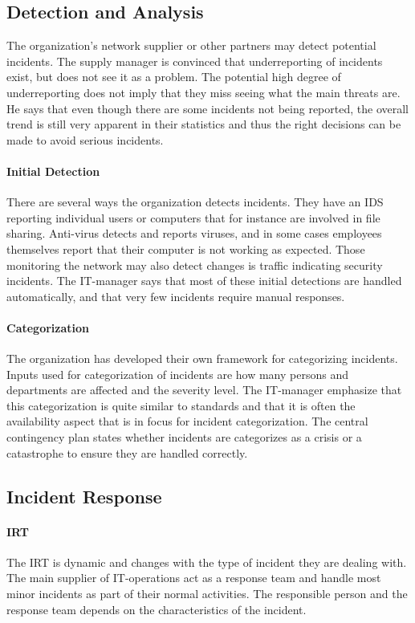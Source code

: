 \subsection{Detection and Analysis}
The organization's network supplier or other partners may detect potential incidents. The supply manager is convinced that underreporting of incidents exist, but does not see it as a problem. The potential high degree of underreporting does not imply that they miss seeing what the main threats are. He says that even though there are some incidents not being reported, the overall trend is still very apparent in their statistics and thus the right decisions can be made to avoid serious incidents. 

\paragraph{Initial Detection}
There are several ways the organization detects incidents. They have an \ac{IDS} reporting individual users or computers that for instance are involved in file sharing. Anti-virus detects and reports viruses, and in some cases employees themselves report that their computer is not working as expected. Those monitoring the network may also detect changes is traffic indicating security incidents. The IT-manager says that most of these initial detections are handled automatically, and that very few incidents require manual responses. 

\paragraph{Categorization}
The organization has developed their own framework for categorizing incidents. Inputs used for categorization of incidents are how many persons and departments are affected and the severity level. The IT-manager emphasize that this categorization is quite similar to standards and that it is often the availability aspect that is in focus for incident categorization. The central contingency plan states whether incidents are categorizes as a crisis or a catastrophe to ensure they are handled correctly.

\subsection{Incident Response}

\paragraph{\acl{IRT}}
The \ac{IRT} is dynamic and changes with the type of incident they are dealing with. The main supplier of IT-operations act as a response team and handle most minor incidents as part of their normal activities. The responsible person and the response team depends on the characteristics of the incident.   

